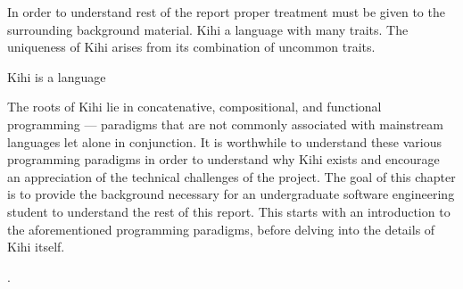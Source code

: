 

In order to understand rest of the report proper treatment must be given to the surrounding background material.  Kihi a language with many traits. The uniqueness of Kihi arises from its combination of uncommon traits.

Kihi is a language 

The roots of Kihi lie in concatenative, compositional, and functional programming --- paradigms that are not commonly associated with mainstream languages let alone in conjunction. It is worthwhile to understand these various programming paradigms in order to understand why Kihi exists and encourage an appreciation of the technical challenges of the project. The goal of this chapter is to provide the background necessary for an undergraduate software engineering student
to understand the rest of this report. This starts with an introduction to the aforementioned programming paradigms, before delving into the details of Kihi itself.



.


